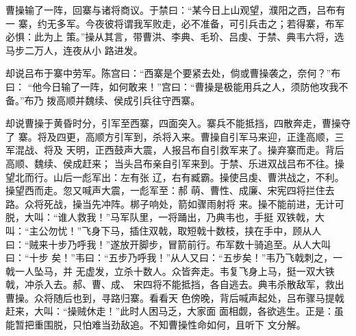 曹操输了一阵，回寨与诸将商议。于禁曰：“某今日上山观望，濮阳之西，吕布有一
寨，约无多军。今夜彼将谓我军败走，必不准备，可引兵击之；若得寨，布军必惧：此为上
策。”操从其言，带曹洪、李典、毛玠、吕虔、于禁、典韦六将，选马步二万人，连夜从小
路进发。

却说吕布于寨中劳军。陈宫曰：“西寨是个要紧去处，倘或曹操袭之，奈何？”布曰：
“他今日输了一阵，如何敢来！”宫曰：“曹操是极能用兵之人，须防他攻我不备。”布乃
拨高顺并魏续、侯成引兵往守西寨。

却说曹操于黄昏时分，引军至西寨，四面突入。寨兵不能抵挡，四散奔走，曹操夺了
寨。将及四更，高顺方引军到，杀将入来。曹操自引军马来迎，正逢高顺，三军混战、将及
天明，正西鼓声大震，人报吕布自引救军来了。操弃寨而走。背后高顺、魏续、侯成赶来；
当头吕布亲自引军来到。于禁、乐进双战吕布不往。操望北而行。山后一彪军出：左有张
辽，右有臧霸。操使吕虔、曹洪战之，不利。操望西而走。忽又喊声大震，一彪军至：郝
萌、曹性、成廉、宋宪四将拦住去路。众将死战，操当先冲阵。梆子响处，箭如骤雨射将
来。操不能前进，无计可脱，大叫：“谁人救我！”马军队里，一将踊出，乃典韦也，手挺
双铁戟，大叫：“主公勿忧！”飞身下马，插住双戟，取短戟十数枝，挟在手中，顾从人
曰：“贼来十步乃呼我！”遂放开脚步，冒箭前行。布军数十骑追至。从人大叫曰：“十步
矣！”韦曰：“五步乃呼我！”从人又曰：“五步矣！”韦乃飞戟刺之，一戟一人坠马，并
无虚发，立杀十数人。众皆奔走。韦复飞身上马，挺一双大铁戟，冲杀入去。郝、曹、成、
宋四将不能抵挡，各自逃去。典韦杀散敌军，救出曹操。众将随后也到，寻路归寨。看看天
色傍晚，背后喊声起处，吕布骤马提戟赶来，大叫：“操贼休走！”此时人困马乏，大家面
面相觑，各欲逃生。正是：虽能暂把重围脱，只怕难当劲敌追。不知曹操性命如何，且听下
文分解。